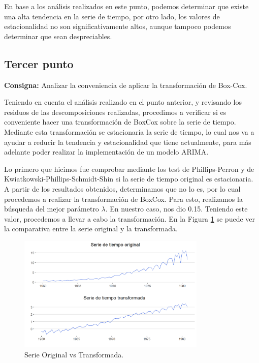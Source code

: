 \documentclass{article} %
\begin{document}
En base a los análisis realizados en este punto, podemos determinar que existe una alta tendencia en la serie de tiempo, por otro lado, los valores de estacionalidad no son significativamente altos, aunque tampoco podemos determinar que sean despreciables.

\subsection{Tercer punto}

\textbf{Consigna:} Analizar la conveniencia de aplicar la transformación de Box-Cox.

Teniendo en cuenta el análisis realizado en el punto anterior, y revisando los residuos de las descomposiciones realizadas, procedimos a verificar si es conveniente hacer una transformación de BoxCox sobre la serie de tiempo. Mediante esta transformación se estacionaría la serie de tiempo, lo cual nos va a ayudar a reducir la tendencia y estacionalidad que tiene actualmente, para más adelante poder realizar la implementación de un modelo ARIMA. 

Lo primero que hicimos fue comprobar mediante los test de Phillips-Perron y de Kwiatkowski-Phillips-Schmidt-Shin si la serie de tiempo original es estacionaria. A partir de los resultados obtenidos, determinamos que no lo es, por lo cual procedemos a realizar la transformación de BoxCox. Para esto, realizamos la búsqueda del mejor parámetro $\lambda$. En nuestro caso, nos dio 0.15. Teniendo este valor, procedemos a llevar a cabo la transformación. En la Figura \ref{fig:Transformada} se puede ver la comparativa entre la serie original y la transformada.

\begin{figure}[H]
	\centering
	\includegraphics[width=0.8\textwidth]{images/4-6 Transformada}
	\caption{Serie Original vs Transformada.}
	\label{fig:Transformada}
\end{figure} 
\end{document}
